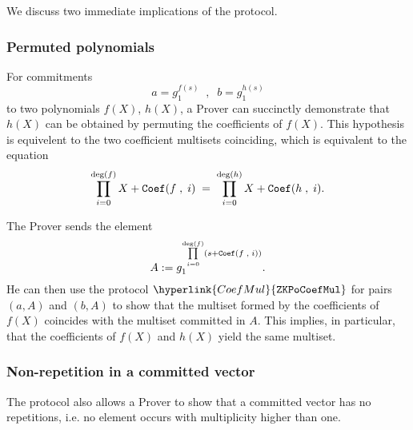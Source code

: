 \documentclass[11pt, lettersize, notitlepage, leqno, footskip=0.6cm]{article}
\newcommand{\bFp}{\mathbb{F}_p}
\newcommand{\lra}{\longrightarrow}
\newcommand{\mc}{\mathcal}
\newcommand{\mb}{\mathbb}
\newcommand{\vs}{\vspace{-0.15cm}}
\newcommand{\noin}{\noindent}
\numberwithin{equation}{section}
\begin{document}
\noin We discuss two immediate implications of the protocol. \vspace{2mm}

\subsubsection{\fontsize{11}{11}\selectfont Permuted polynomials}



For commitments $$ a = g_1^{f(s)}\;\;,\;\;  b = g_1^{h(s)}  $$ to two polynomials $f(X)$, $h(X)$, a Prover can succinctly demonstrate that $h(X)$ can be obtained by permuting the coefficients of $f(X)$. This hypothesis is equivelent to the two coefficient multisets coinciding, which is equivalent to the equation \vs $$ \prod\limits_{i=0}^{\deg(f)} X+{\tt{Coef}}(f\;,\;i) \; = \; \prod\limits_{i=0}^{\deg(h)}  X + {\tt{Coef}}(h\;,\;i).   $$

\noin The Prover sends the element \vs $$ A:=  g_1^{\prod\limits_{i=0}^{\deg(f)} (s+{\tt{Coef}}(f\;,\;i))}. $$ He can then use the protocol $\hyperlink{CoefMul}{\tt{ZKPoCoefMul}}$ for pairs $(a, A)$ and $(b, A)$ to show that the multiset formed by the coefficients of $f(X)$ coincides with the multiset committed in $A$. This implies, in particular, that the coefficients of $f(X)$ and $h(X)$ yield the same multiset. 


\begin{comment} This is a HVZK for the following relation:

\vs $$\mc{R}_{\tt{Perm}}[g_1,\;(a,\;b)] = \left\{\begin{array}{l} \big((a,\;  b\;\in\;\mb{G}_1)\;\;,\;\; f(X)\; \in \;\bFp[X]\\

\text{Permutation }\sigma:\;\big[|{\tt{CRS}}|\big]\;\lra\; \big[|{\tt{CRS}}|\big]  \big) :\\

a = g_1^{f(s)}\;\;,\;\;b = g_1^{f^{\sigma}(s)}

\end{array}\right\}  $$ \end{comment}





\subsubsection{\fontsize{11}{11}\selectfont Non-repetition in a committed vector}


The protocol also allows a Prover to show that a committed vector has no repetitions, i.e. no element occurs with multiplicity higher than one. 
\end{document}
